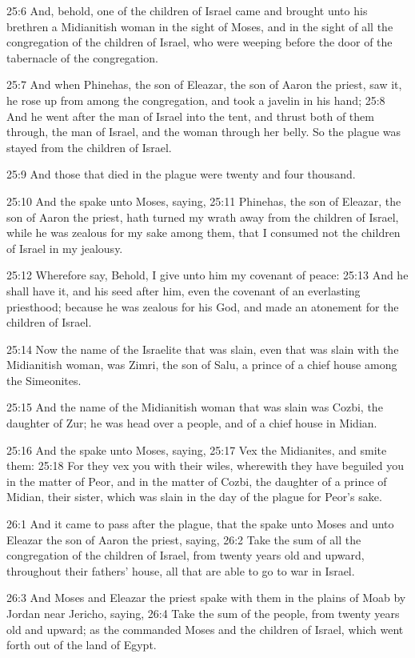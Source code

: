 25:6 And, behold, one of the children of Israel came and brought unto
his brethren a Midianitish woman in the sight of Moses, and in the
sight of all the congregation of the children of Israel, who were
weeping before the door of the tabernacle of the congregation.

25:7 And when Phinehas, the son of Eleazar, the son of Aaron the
priest, saw it, he rose up from among the congregation, and took a
javelin in his hand; 25:8 And he went after the man of Israel into the
tent, and thrust both of them through, the man of Israel, and the
woman through her belly. So the plague was stayed from the children of
Israel.

25:9 And those that died in the plague were twenty and four thousand.

25:10 And the \LORD spake unto Moses, saying, 25:11 Phinehas, the son
of Eleazar, the son of Aaron the priest, hath turned my wrath away
from the children of Israel, while he was zealous for my sake among
them, that I consumed not the children of Israel in my jealousy.

25:12 Wherefore say, Behold, I give unto him my covenant of peace:
25:13 And he shall have it, and his seed after him, even the covenant
of an everlasting priesthood; because he was zealous for his God, and
made an atonement for the children of Israel.

25:14 Now the name of the Israelite that was slain, even that was
slain with the Midianitish woman, was Zimri, the son of Salu, a prince
of a chief house among the Simeonites.

25:15 And the name of the Midianitish woman that was slain was Cozbi,
the daughter of Zur; he was head over a people, and of a chief house
in Midian.

25:16 And the \LORD spake unto Moses, saying, 25:17 Vex the Midianites,
and smite them: 25:18 For they vex you with their wiles, wherewith
they have beguiled you in the matter of Peor, and in the matter of
Cozbi, the daughter of a prince of Midian, their sister, which was
slain in the day of the plague for Peor's sake.

26:1 And it came to pass after the plague, that the \LORD spake unto
Moses and unto Eleazar the son of Aaron the priest, saying, 26:2 Take
the sum of all the congregation of the children of Israel, from twenty
years old and upward, throughout their fathers' house, all that are
able to go to war in Israel.

26:3 And Moses and Eleazar the priest spake with them in the plains of
Moab by Jordan near Jericho, saying, 26:4 Take the sum of the people,
from twenty years old and upward; as the \LORD commanded Moses and the
children of Israel, which went forth out of the land of Egypt.

